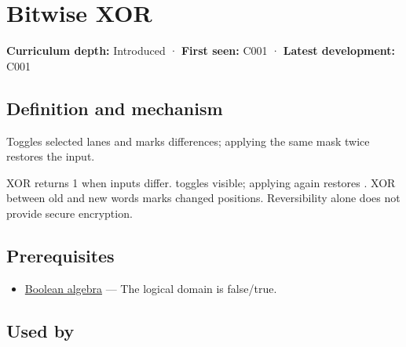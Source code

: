 \hypertarget{appendix-d49161831368}{}\label{referencestart:appendix-d49161831368}
\section{Bitwise XOR}\label{appendix-d49161831368-bitwise-xor}

\hypertarget{appendix-d49161831368-bitwise-xor}{}

\textbf{Curriculum depth:} Introduced · \textbf{First seen:} C001 · \textbf{Latest development:} C001

\begin{allmightroledefinition}

\subsection{Definition and mechanism}\label{appendix-d49161831368-definition-and-mechanism}

\hypertarget{appendix-d49161831368-definition-and-mechanism}{}

Toggles selected lanes and marks differences; applying the same mask twice restores the input.

\end{allmightroledefinition}

XOR returns 1 when inputs differ.  toggles visible; applying  again restores . XOR between old and new words marks changed positions. Reversibility alone does not provide secure encryption.

\subsection{Prerequisites}\label{appendix-d49161831368-prerequisites}

\hypertarget{appendix-d49161831368-prerequisites}{}

\begin{itemize}
\tightlist
\item
  \hyperref[appendix-24475e1596a8]{Boolean algebra} --- The logical domain is false/true.
\end{itemize}

\subsection{Used by}\label{appendix-d49161831368-used-by}

